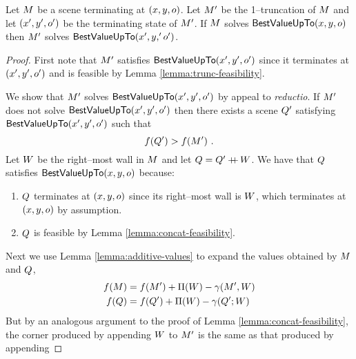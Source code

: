 \begin{theorem}
  Let $\Scene$ be a scene terminating at $(x,y,\WallOrient)$. Let
  $\TruncScene$ be the 1--truncation of $\Scene$ and let
  $(x',y',\WallOrient')$ be the terminating state of
  $\TruncScene$. If $\Scene$ solves $\SubProb(x,y,\WallOrient)$
  then $\TruncScene$ solves $\SubProb(x',y,'\WallOrient')$.
  \label{thm:substructure}
\end{theorem}
\begin{proof}
  First note that $\TruncScene$ satisfies
  $\SubProb(x',y',\WallOrient')$ since it terminates at
  $(x',y',\WallOrient')$ and is feasible by Lemma
  \ref{lemma:trunc-feasibility}.

  We show that $\TruncScene$ solves $\SubProb(x',y',\WallOrient')$
  by appeal to \textit{reductio}. If $\TruncScene$ does not solve
  $\SubProb(x',y',\WallOrient')$ then there exists a scene
  $\CfTruncScene$ satisfying $\SubProb(x',y',\WallOrient')$ such
  that
  \begin{equation}
    \label{eq:cf-value}
    \Objective(\CfTruncScene) > \Objective(\TruncScene) ~.
  \end{equation}
  Let $\Wall$ be the right--most wall in $\Scene$ and let $\CfScene =
  \CfTruncScene \concat \Wall$. We have that $\CfScene$ satisfies
  $\SubProb(x,y,\WallOrient)$ because:
  \begin{enumerate}
    \item{$\CfScene$ terminates at $(x,y,\WallOrient)$ since its
      right--most wall is $\Wall$, which terminates at
      $(x,y,\WallOrient)$ by assumption.}
    \item{$\CfScene$ is feasible by Lemma
      \ref{lemma:concat-feasibility}.}
  \end{enumerate}
  Next we use Lemma \ref{lemma:additive-values} to expand the values
  obtained by $\Scene$ and $\CfScene$,
  \begin{equation}
  \begin{split}
    \label{eq:concat-values}
    \Objective(\Scene) &=
      \Objective(\TruncScene) + \WallPayoff(\Wall) - 
      \CornerPenalty(\TruncScene,\Wall) \\
    \Objective(\CfScene) &=
      \Objective(\CfTruncScene) + \WallPayoff(\Wall) - 
      \CornerPenalty(\CfTruncScene;\Wall)
  \end{split}
  \end{equation}
  But by an analogous argument to the proof of Lemma
  \ref{lemma:concat-feasibility}, the corner produced by appending
  $\Wall$ to $\TruncScene$ is the same as that produced by appending

\end{proof}
